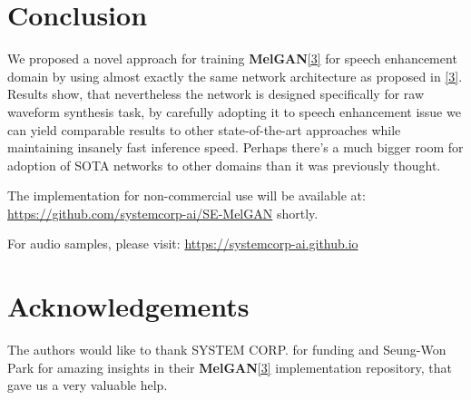 \documentclass{article}
\begin{document}
\section{Conclusion}
\begin{flushleft}
We proposed a novel approach for training \textbf{MelGAN}\hyperlink{refer}{[3]}  for speech enhancement domain by using almost exactly the same network architecture as proposed in \hyperlink{refer}{[3]}. Results show, that nevertheless the network is designed specifically for raw waveform synthesis task, by carefully adopting it to speech enhancement issue we can yield comparable results to other state-of-the-art approaches while maintaining insanely fast inference speed.
Perhaps there's a much bigger room for adoption of SOTA networks to other domains than it was previously thought.

The implementation for non-commercial use will be available at: \href{https://github.com/systemcorp-ai/SE-MelGAN}{https://github.com/systemcorp-ai/SE-MelGAN} shortly.
\end{flushleft}
\begin{flushleft}
For audio samples, please visit: \href{https://systemcorp-ai.github.io}{https://systemcorp-ai.github.io}
\end{flushleft}


\section{Acknowledgements}
\begin{flushleft}
The authors would like to thank SYSTEM CORP. for funding and Seung-Won Park for amazing insights in their \textbf{MelGAN}\hyperlink{refer}{[3]} implementation repository, that gave us a very valuable help.
\end{flushleft}




  

\hypertarget{refer}{}
\nocite{*}
\end{document}
